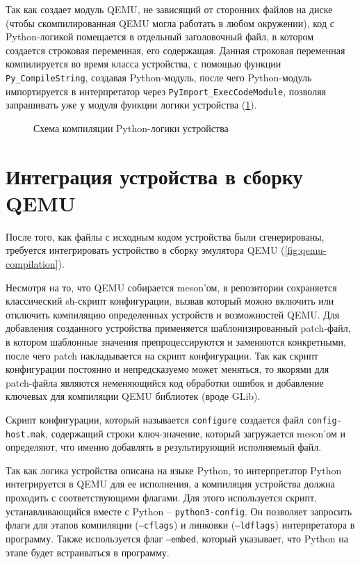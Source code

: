 Так как {\mylanguage} создает модуль QEMU, не зависящий от сторонних файлов
на диске (чтобы скомпилированная QEMU могла работать в любом окружении),
код с Python-логикой помещается в отдельный заголовочный файл, в котором
создается строковая переменная, его содержащая.
Данная строковая переменная компилируется во время класса устройства,
с помощью функции \texttt{Py\_CompileString}, создавая Python-модуль,
после чего Python-модуль импортируется в интерпретатор
через \texttt{PyImport\_ExecCodeModule}, позволяя запрашивать уже у модуля
функции логики устройства (\cref{fig:qemu-python-startup}).

\begin{figure}[!htbp]
    \centering
    \hspace*{-11.5cm}
    \begin{minipage}{10cm}
        
    \end{minipage}
    \caption{Схема компиляции Python-логики устройства}\label{fig:qemu-python-startup}
\end{figure}


\section{Интеграция устройства в сборку QEMU}\label{sec:ch2/sec2/sub7}

После того, как файлы с исходным кодом устройства были сгенерированы, требуется
интегрировать устройство в сборку эмулятора QEMU (\cref{fig:qemu-compilation}).

Несмотря на то, что QEMU собирается meson'ом, в репозитории сохраняется
классический sh-скрипт конфигурации, вызвав который можно включить
или отключить компиляцию определенных устройств и возможностей QEMU.
Для добавления созданного устройства применяется шаблонизированный patch-файл,
в котором шаблонные значения препроцессируются и заменяются конкретными,
после чего patch накладывается на скрипт конфигурации.
Так как скрипт конфигурации постоянно и непредсказуемо может меняться,
то якорями для patch-файла являются неменяющийся код обработки ошибок
и добавление ключевых для компиляции QEMU библиотек (вроде GLib).

Скрипт конфигурации, который называется \texttt{configure} создается
файл \texttt{config-host.mak}, содержащий строки ключ-значение,
который загружается meson'ом и определяют, что именно добавлять в
результирующий исполняемый файл.

Так как логика устройства описана на языке Python, то интерпретатор Python
интегрируется в QEMU для ее исполнения, а компиляция устройства должна
проходить с соответствующими флагами. Для этого используется
скрипт, устанавливающийся вместе с Python -- \texttt{python3-config}.
Он позволяет запросить флаги для этапов компиляции (\texttt{--cflags})
и линковки (\texttt{--ldflags}) интерпретатора в программу.
Также используется флаг \texttt{--embed}, который указывает,
что Python на этапе будет встраиваться в программу.

